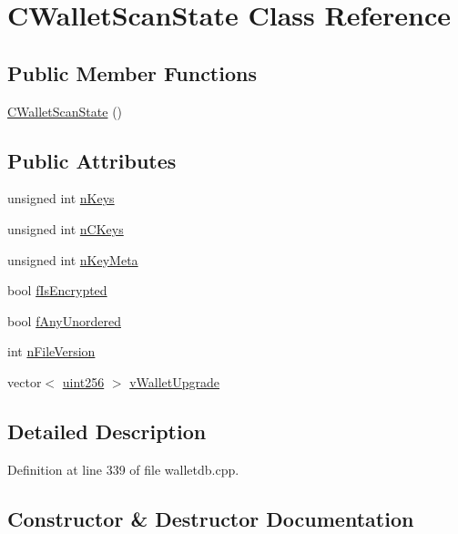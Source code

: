\hypertarget{class_c_wallet_scan_state}{}\section{C\+Wallet\+Scan\+State Class Reference}
\label{class_c_wallet_scan_state}
\subsection*{Public Member Functions}
\begin{DoxyCompactItemize}
\item 
\hyperlink{class_c_wallet_scan_state_a8012f2b0c336f7ee0b842d875f4fa4e6}{C\+Wallet\+Scan\+State} ()
\end{DoxyCompactItemize}
\subsection*{Public Attributes}
\begin{DoxyCompactItemize}
\item 
unsigned int \hyperlink{class_c_wallet_scan_state_a8a6e0071320cbfffc6d7d49ded5d506e}{n\+Keys}
\item 
unsigned int \hyperlink{class_c_wallet_scan_state_ae1316ee4cfdf8fbff91ca32a5d0f2b6a}{n\+C\+Keys}
\item 
unsigned int \hyperlink{class_c_wallet_scan_state_a2cfbc8894839188b57be22e72f2d6de4}{n\+Key\+Meta}
\item 
bool \hyperlink{class_c_wallet_scan_state_a13c5139c5966079d1be4c739666c5243}{f\+Is\+Encrypted}
\item 
bool \hyperlink{class_c_wallet_scan_state_acafa7b6a27ec1a4714e9a7b331067e9d}{f\+Any\+Unordered}
\item 
int \hyperlink{class_c_wallet_scan_state_ad68ce61566ee2baf3d7b04b1390942d1}{n\+File\+Version}
\item 
vector$<$ \hyperlink{classuint256}{uint256} $>$ \hyperlink{class_c_wallet_scan_state_a6cbf626ca5a0275f0469684f22dff12f}{v\+Wallet\+Upgrade}
\end{DoxyCompactItemize}


\subsection{Detailed Description}


Definition at line 339 of file walletdb.\+cpp.



\subsection{Constructor \& Destructor Documentation}
\hypertarget{class_c_wallet_scan_state_a8012f2b0c336f7ee0b842d875f4fa4e6}{}
